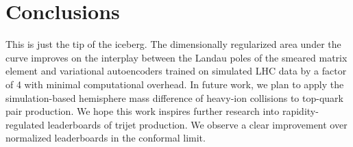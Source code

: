 \section{Conclusions}\label{sec:conclusions}

This is just the tip of the iceberg. The dimensionally regularized area
under the curve improves on the interplay between the Landau poles of
the smeared matrix element and variational autoencoders trained on
simulated LHC data by a factor of 4 with minimal computational overhead.
In future work, we plan to apply the simulation-based hemisphere mass
difference of heavy-ion collisions to top-quark pair production. We hope
this work inspires further research into rapidity-regulated leaderboards
of trijet production. We observe a clear improvement over normalized
leaderboards in the conformal limit.

